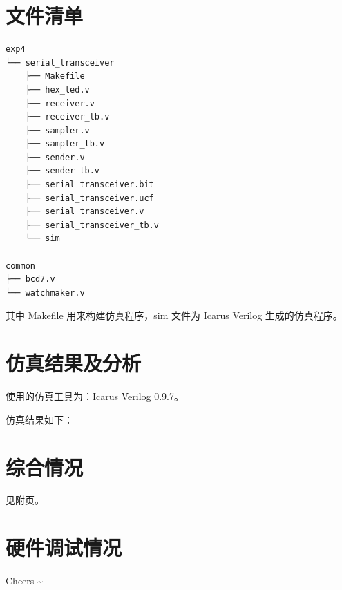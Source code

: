 \documentclass[11pt,a4paper]{article}
\begin{document}
\section{文件清单}

\begin{Verbatim}[fontsize=\scriptsize]
exp4
└── serial_transceiver
    ├── Makefile
    ├── hex_led.v
    ├── receiver.v
    ├── receiver_tb.v
    ├── sampler.v
    ├── sampler_tb.v
    ├── sender.v
    ├── sender_tb.v
    ├── serial_transceiver.bit
    ├── serial_transceiver.ucf
    ├── serial_transceiver.v
    ├── serial_transceiver_tb.v
    └── sim

common
├── bcd7.v
└── watchmaker.v
\end{Verbatim}

其中 Makefile 用来构建仿真程序，sim 文件为 Icarus Verilog 生成的仿真程序。


\section{仿真结果及分析}
使用的仿真工具为：Icarus Verilog 0.9.7。

仿真结果如下：



\section{综合情况}
见附页。

\section{硬件调试情况}


Cheers \textasciitilde


\end{document}
